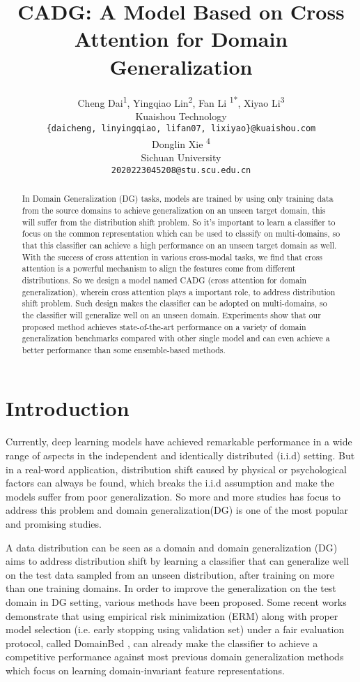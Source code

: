 \documentclass{article}
\title{CADG: A Model Based on Cross Attention for Domain Generalization }
\author{
  Cheng Dai\textsuperscript{1}, Yingqiao Lin\textsuperscript{2}, Fan Li \textsuperscript{1*}, Xiyao Li\textsuperscript{3}\\
  Kuaishou Technology \\
  \texttt{\{daicheng, linyingqiao, lifan07, lixiyao\}@kuaishou.com} \\
\And
  Donglin Xie \textsuperscript{4} \\
  Sichuan University \\
  \texttt{2020223045208@stu.scu.edu.cn} \\
}
\begin{document}
\maketitle


\begin{abstract}
In Domain Generalization (DG) tasks, models are trained by using only training data from the source domains to achieve generalization on an unseen target domain, this will suffer from the distribution shift problem. So it's important to learn a classifier to focus on the common representation which can be used to classify on multi-domains, so that this classifier can achieve a high performance on an unseen target domain as well. With the success of cross attention in various cross-modal tasks, we find that cross attention is a powerful mechanism to align the features come from different distributions. So we design a model named CADG (cross attention for domain generalization), wherein cross attention plays a important role, to address distribution shift problem. Such design makes the classifier can be adopted on multi-domains, so the classifier will generalize well on an unseen domain. Experiments show that our proposed method achieves state-of-the-art performance on a variety of domain generalization benchmarks compared with other single model and can even achieve a better performance than some ensemble-based methods. 
\end{abstract}




\section{Introduction}
Currently, deep learning models have achieved remarkable performance in a wide range of aspects in the independent and identically distributed (i.i.d) setting. But in a real-word application, distribution shift caused by physical or psychological factors can always be found, which breaks the i.i.d assumption and make the models suffer from poor generalization. So more and more studies has focus to address this problem and domain generalization\cite{blanchard2011generalizing}(DG) is one of the most popular and promising studies.

A data distribution can be seen as a domain and domain generalization (DG) aims to address distribution shift by learning a classifier that can generalize well on the test data sampled from an unseen distribution,  after training on more than one training domains. In order to improve the generalization on the test domain in DG setting, various methods have been proposed. Some recent works demonstrate that using empirical risk minimization\cite{vladimir1998statistical} (ERM) along with proper model selection (i.e. early stopping using validation set) under a fair evaluation protocol, called DomainBed \cite{gulrajani2020search}, can already make the classifier to achieve a competitive performance against most previous domain generalization methods which focus on learning domain-invariant feature representations. 
\end{document}
